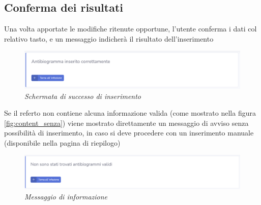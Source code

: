 \subsection{Conferma dei risultati}
Una volta apportate le modifiche ritenute opportune, l'utente conferma i dati col relativo tasto, e un messaggio indicherà il risultato dell'inserimento
\begin{figure}[h!]
	\centering
	\includegraphics[width=.99\columnwidth]{images/confirm.png}
	\caption{\textit{Schermata di successo di inserimento}}
	\label{fig:confirm_success}
\end{figure}
\newline
Se il referto non contiene alcuna informazione valida (come mostrato nella figura \ref{fig:content_senza}) viene mostrato direttamente un messaggio di avviso senza possibilità di inserimento, in caso si deve procedere con un inserimento manuale (disponibile nella pagina di riepilogo)
\begin{figure}[h!]
	\centering
	\includegraphics[width=.99\columnwidth]{images/no_table.png}
	\caption{\textit{Messaggio di informazione}}
	\label{fig:info_no_table}
\end{figure}


